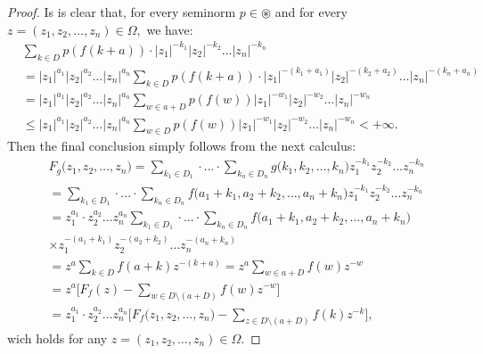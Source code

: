 \documentclass{amsart}
\theoremstyle{definition}
\theoremstyle{remark}
\numberwithin{equation}{section}
\begin{document}
\begin{proof}
Is is clear that, for every seminorm $p\in \circledast$ and for every $z=(z_{1},z_{2},\ldots ,z_{n})\in \Omega ,$ we have:
\begin{align*}
& \sum_{k\in D}p(f(k+a))  \cdot \bigl|z_{1}\bigr|^{-k_{1}}\bigl|z_{2}\bigr|^{-k_{2}}\ldots \bigl| z_{n}\bigr|^{-k_{n}}
\\& = \bigl|z_{1}\bigr|^{a_{1}}\bigl|z_{2}\bigr|^{a_{2}}\ldots \bigl| z_{n}\bigr|^{a_{n}} \sum_{k\in D}p(f(k+a)) \cdot \bigl|z_{1}\bigr|^{-(k_{1}+a_{1})}\bigl|z_{2}\bigr|^{-(k_{2}+a_{2})}\ldots \bigl| z_{n}\bigr|^{-(k_{n}+a_{n})}
\\& =\bigl|z_{1}\bigr|^{a_{1}}\bigl|z_{2}\bigr|^{a_{2}}\ldots \bigl| z_{n}\bigr|^{a_{n}} \sum_{w\in a+D}p(f(w))\bigl|z_{1}\bigr|^{-w_{1}}\bigl|z_{2}\bigr|^{-w_{2}}\ldots \bigl| z_{n}\bigr|^{-w_{n}}
\\& \leq \bigl|z_{1}\bigr|^{a_{1}}\bigl|z_{2}\bigr|^{a_{2}}\ldots \bigl| z_{n}\bigr|^{a_{n}} \sum_{w\in D}p(f(w))\bigl|z_{1}\bigr|^{-w_{1}}\bigl|z_{2}\bigr|^{-w_{2}}\ldots \bigl| z_{n}\bigr|^{-w_{n}}<+\infty.
\end{align*}
Then the final conclusion simply follows from the next calculus:{\small
\begin{align*}
& F_{g}\bigl(z_{1},z_{2},\ldots ,z_{n}\bigr)=\sum _{k_{1}\in D_{1} }\cdot ... \cdot \sum _{k_{n}\in D_{n} }g\bigl(k_{1},k_{2},\ldots ,k_{n}\bigr)z_{1}^{-k_{1}}z_{2}^{-k_{2}}\ldots z_{n}^{-k_{n}}
\\& =\sum _{k_{1}\in D_{1} }\cdot ... \cdot \sum _{k_{n}\in D_{n} }f\bigl(a_{1}+k_{1},a_{2}+k_{2},\ldots ,a_{n}+k_{n}\bigr)z_{1}^{-k_{1}}z_{2}^{-k_{2}}\ldots z_{n}^{-k_{n}}
\\& =  z_{1}^{a_{1}}\cdot z_{2} ^{a_{2}}\ldots z_{n}^{a_{n}}\sum _{k_{1}\in D_{1} }\cdot ... \cdot \sum _{k_{n}\in D_{n} }f\bigl(a_{1}+k_{1},a_{2}+k_{2},\ldots ,a_{n}+k_{n}\bigr)
\\& \times z_{1}^{-(a_{1}+k_{1})}z_{2}^{-(a_{2}+k_{2})}\ldots z_{n}^{-(a_{n}+k_{n})}
\\& =z^{a}\sum_{k\in D}f(a+k)z^{-(k+a)}=z^{a}\sum_{w\in a+D}f(w)z^{-w}
\\& =z^{a}\Biggl[ F_{f}(z)-\sum_{w\in D\setminus (a+D)}f(w)z^{-w}\Biggr]
\\& =z_{1}^{a_{1}}\cdot z_{2} ^{a_{2}}\ldots z_{n}^{a_{n}}\Biggl[ F_{f}\bigl(z_{1},z_{2},\ldots ,z_{n}\bigr)-\sum_{z\in D\setminus (a+D)}f(k)z^{-k}\Biggr],
\end{align*}}
wich holds for any $z=(z_{1},z_{2},\ldots ,z_{n})\in \Omega.$
\end{proof}
\end{document}
